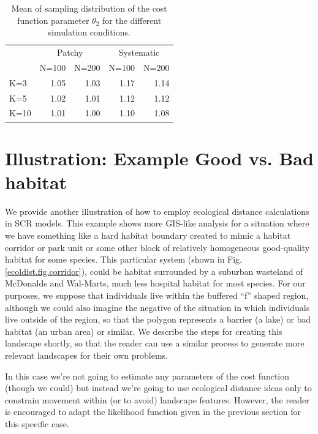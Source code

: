 \begin{table}[htp]
\centering
\caption{
Mean of sampling distribution of the cost function parameter
$\theta_{2}$ for the different simulation
conditions. 
}
\begin{tabular}{l|rrrr}
 & \multicolumn{2}{c}{Patchy} & \multicolumn{2}{c}{Systematic} \\
    & N=100 &  N=200  &   N=100 &  N=200  \\ \hline
K=3 &   1.05&    1.03 &     1.17 & 1.14 \\
K=5 &   1.02&    1.01 &     1.12 &1.12 \\
K=10&   1.01&    1.00 &     1.10 &1.08 \\
\end{tabular}
\label{tab.results2}
\end{table}





\section{Illustration: Example Good vs. Bad habitat}

We provide another illustration of how to employ ecological distance
calculations in SCR models. This example shows more GIS-like analysis
for a situation where we have something like a hard habitat boundary
created to mimic a habitat corridor or park unit or some other block
of relatively homogeneous good-quality habitat for some species. This
particular system (shown in Fig. \ref{ecoldist.fig.corridor}), could
be habitat surrounded by a suburban wasteland of McDonalds and
Wal-Marts, much less hospital habitat for most species.  For our
purposes, we suppose that individuals live within the buffered ``f''
shaped region, although we could also imagine the negative of the
situation in which individuals live outside of the region, so that the
polygon represents a barrier (a lake) or bad habitat (an urban area)
or similar.  We describe the steps for creating this landscape
shortly, so that the reader can use a similar process to generate more
relevant landscapes for their own problems.

In this case we're not going to estimate any parameters of the cost
function (though we could) but instead we're going to use ecological
distance ideas only to constrain movement within (or to avoid)
landscape features.  However, the reader is encouraged to adapt the
likelihood function given in the previous section for this specific
case. 

